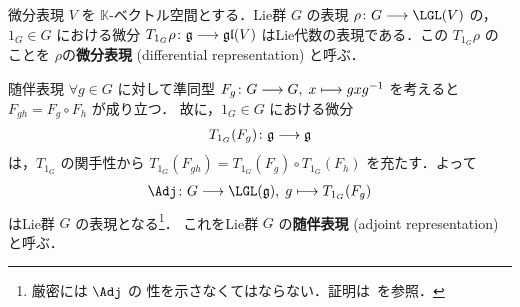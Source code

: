 \documentclass[TQFT_main]{subfiles}
\begin{document}


\begin{mydef}[label=def:diff-rep]{微分表現}
    $V$ を $\mathbb{K}$-ベクトル空間とする．Lie群 $G$ の表現 $\rho \colon G \lto \LGL (V)$ の，$1_G \in G$ における微分
    $T_{1_G} \rho \colon \mathfrak{g} \longrightarrow \mathfrak{gl}(V)$ はLie代数の表現である．この $T_{1_G} \rho$ のことを $\rho$の\textbf{微分表現} (differential representation) と呼ぶ．
\end{mydef}

\begin{myexample}[label=def:Lie-adj]{随伴表現}
    $\forall g \in G$ に対して準同型 $F_g \colon G \longrightarrow G,\; x \longmapsto gxg^{-1}$ を考えると $F_{gh} = F_g \circ F_h$ が成り立つ．
    故に，$1_G \in G$ における微分
    \begin{align}
        T_{1_G} (F_g) \colon \mathfrak{g} \longrightarrow \mathfrak{g}
    \end{align}
    は，$T_{1_G}$ の関手性から $T_{1_G}(F_{gh}) = T_{1_G}(F_g) \circ T_{1_G}(F_h)$ を充たす．よって
    \begin{align}
        \Adj \colon G \lto \LGL (\mathfrak{g}),\; g \lmto T_{1_G} (F_g)
    \end{align}
    はLie群 $G$ の表現となる\footnote{厳密には $\Adj$ の \cinfty 性を示さなくてはならない．証明は~\cite[p.534, Proposition 20.24]{Lee2012smooth}を参照．}．
    これをLie群 $G$ の\textbf{随伴表現} (adjoint representation) と呼ぶ．
    

\end{myexample}
\end{document}

